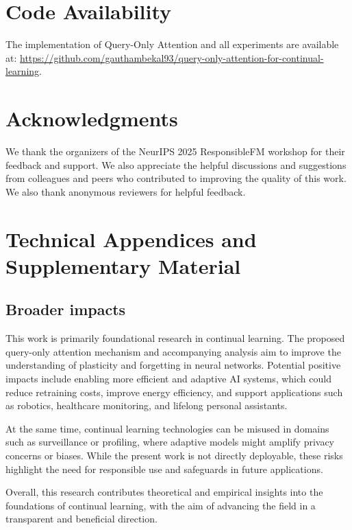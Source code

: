 \documentclass{article}
\begin{document}
\clearpage

\section*{Code Availability}
The implementation of Query-Only Attention and all experiments are available at:
\url{https://github.com/gauthambekal93/query-only-attention-for-continual-learning}.

\section*{Acknowledgments}
We thank the organizers of the NeurIPS 2025 ResponsibleFM workshop for their feedback and support. We also appreciate the helpful discussions and suggestions from colleagues and peers who contributed to improving the quality of this work.
We also thank anonymous reviewers for helpful feedback.






\appendix


\section{Technical Appendices and Supplementary Material}


\subsection{Broader impacts}
\label{sec:broader_impacts}
This work is primarily foundational research in continual learning. 
The proposed query-only attention mechanism and accompanying analysis aim to improve the 
understanding of plasticity and forgetting in neural networks. 
Potential positive impacts include enabling more efficient and adaptive AI systems, 
which could reduce retraining costs, improve energy efficiency, and support applications 
such as robotics, healthcare monitoring, and lifelong personal assistants.  

At the same time, continual learning technologies can be misused in domains such as 
surveillance or profiling, where adaptive models might amplify privacy concerns or biases.  
While the present work is not directly deployable, these risks highlight the need for 
responsible use and safeguards in future applications.  

Overall, this research contributes theoretical and empirical insights into the foundations 
of continual learning, with the aim of advancing the field in a transparent and beneficial direction.
\end{document}
